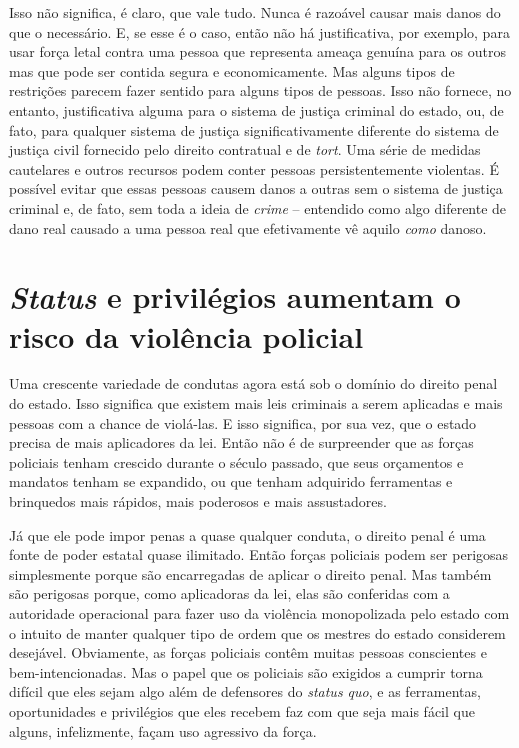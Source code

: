 Isso não significa, é claro, que vale tudo. Nunca é razoável causar mais danos do que o necessário. E, se esse é o caso, então não há justificativa, por exemplo, para usar força letal contra uma pessoa que representa ameaça genuína para os outros mas que pode ser contida segura e economicamente. Mas alguns tipos de restrições parecem fazer sentido para alguns tipos de pessoas. Isso não fornece, no entanto, justificativa alguma para o sistema de justiça criminal do estado, ou, de fato, para qualquer sistema de justiça significativamente diferente do sistema de justiça civil fornecido pelo direito contratual e de \emph{tort}. Uma série de medidas cautelares e outros recursos podem conter pessoas persistentemente violentas. É possível evitar que essas pessoas causem danos a outras sem o sistema de justiça criminal e, de fato, sem toda a ideia de \emph{crime} -- entendido como algo diferente de dano real causado a uma pessoa real que efetivamente vê aquilo \emph{como} danoso.

\section{\emph{Status} e privilégios aumentam o risco da violência policial}

Uma crescente variedade de condutas agora está sob o domínio do direito penal do estado. Isso significa que existem mais leis criminais a serem aplicadas e mais pessoas com a chance de violá-las. E isso significa, por sua vez, que o estado precisa de mais aplicadores da lei. Então não é de surpreender que as forças policiais tenham crescido durante o século passado, que seus orçamentos e mandatos tenham se expandido, ou que tenham adquirido ferramentas e brinquedos mais rápidos, mais poderosos e mais assustadores.

Já que ele pode impor penas a quase qualquer conduta, o direito penal é uma fonte de poder estatal quase ilimitado. Então forças policiais podem ser perigosas simplesmente porque são encarregadas de aplicar o direito penal. Mas também são perigosas porque, como aplicadoras da lei, elas são conferidas com a autoridade operacional para fazer uso da violência monopolizada pelo estado com o intuito de manter qualquer tipo de ordem que os mestres do estado considerem desejável. Obviamente, as forças policiais contêm muitas pessoas conscientes e bem-intencionadas. Mas o papel que os policiais são exigidos a cumprir torna difícil que eles sejam algo além de defensores do \emph{status quo}, e as ferramentas, oportunidades e privilégios que eles recebem faz com que seja mais fácil que alguns, infelizmente, façam uso agressivo da força.

